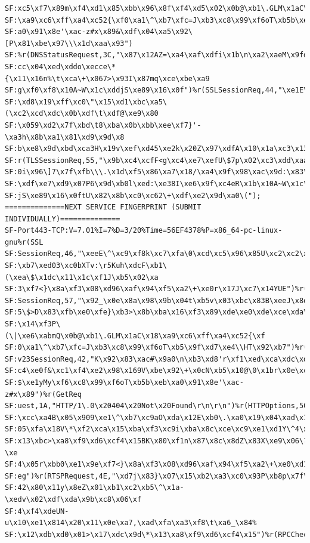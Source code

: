 \documentclass[12pt,a4paper]{report}
\begin{document}
\begin{lstlisting}[breaklines]
SF:xc5\xf7\x89m\xf4\xd1\x85\xbb\x96\x8f\xf4\xd5\x02\x0b@\xb1\.GLM\x1aC\x18
SF:\xa9\xc6\xff\xa4\xc52{\xf0\xa1\^\xb7\xfc=J\xb3\xc8\x99\xf6oT\xb5b\xeb\x
SF:a0\x91\x8e'\xac-z#x\x89&\xdf\x04\xa5\x92\[P\x81\xbe\x97\\\x1d\xaa\x93")
SF:%r(DNSStatusRequest,3C,"\x87\x12AZ=\xa4\xaf\xdfi\x1b\n\xa2\xaeM\x9fd@\x
SF:cc\x04\xed\xddo\xecce\*{\x11\x16n%\t\xca\+\x067>\x93I\x87mq\xce\xbe\xa9
SF:g\xf0\xf8\x10A~W\x1c\xddjS\xe89\x16\x0f")%r(SSLSessionReq,44,"\xe1E\x95
SF:\xd8\x19\xff\xc0\"\x15\xd1\xbc\xa5\(\xc2\xcd\xdc\x0b\xdf\t\xdf@\xe9\x80
SF:\x059\xd2\x7f\xbd\t8\xba\x0b\xbb\xee\xf7}'-\xa3h\x8b\xa1\x81\xd9\x9d\x8
SF:b\xe8\x9d\xbd\xca3H\x19v\xef\xd45\xe2k\x20Z\x97\xdfA\x10\x1a\xc3\x13")%
SF:r(TLSSessionReq,55,"\x9b\xc4\xcfF<g\xc4\xe7\xefU\$7p\x02\xc3\xdd\xaa\xe
SF:0i\x96\]7\x7f\xfb\\\.\x1d\xf5\x86\xa7\x18/\xa4\x9f\x98\xac\x9d:\x83\x84
SF:\xdf\xe7\xd9\x07P6\x9d\xb0l\xed:\xe38I\xe6\x9f\xc4eR\x1b\x10A~W\x1c\xdd
SF:jS\xe89\x16\x0ftU\x82\x8b\xc0\xc62\+\xdf\xe2\x9d\xa0\(");
==============NEXT SERVICE FINGERPRINT (SUBMIT INDIVIDUALLY)==============
SF-Port443-TCP:V=7.01%I=7%D=3/20%Time=56EF4378%P=x86_64-pc-linux-gnu%r(SSL
SF:SessionReq,46,"\xeeE\^\xc9\xf8k\xc7\xfa\0\xcd\xc5\x96\x85U\xc2\xc2\x88`
SF:\xb7\xed03\xc0bXTv:\r5Kuh\xdcF\xb1\(\xea\$\x1dc\x11\x1c\xf1J\xb5\x02\xa
SF:3\xf7<}\x8a\xf3\x08\xd96\xaf\x94\xf5\xa2\+\xe0r\x17J\xc7\x14YUE")%r(TLS
SF:SessionReq,57,"\x92_\x0e\x8a\x98\x9b\x04t\xb5v\x03\xbc\x83B\xeeJ\x8e\xa
SF:5\$>D\x83\xfb\xe0\xfe}\xb3>\x8b\xba\x16\xf3\x89\xde\xe0\xde\xce\xda\xdb
SF:\x14\xf3P\(\|\xe6\xabmQ\x0b@\xb1\.GLM\x1aC\x18\xa9\xc6\xff\xa4\xc52{\xf
SF:0\xa1\^\xb7\xfc=J\xb3\xc8\x99\xf6oT\xb5\x9f\xd7\xe4\\HT\x92\xb7")%r(SSL
SF:v23SessionReq,42,"K\x92\x83\xac#\x9a0\n\xb3\xd8'r\xf1\xed\xca\xdc\xd4\x
SF:c4\xe0f&\xc1\xf4\xe2\x98\x169V\xbe\x92\+\x0cN\xb5\x10@\0\x1br\x0e\xcdB\
SF:$\xe1yMy\xf6\xc8\x99\xf6oT\xb5b\xeb\xa0\x91\x8e'\xac-z#x\x89")%r(GetReq
SF:uest,1A,"HTTP/1\.0\x20404\x20Not\x20Found\r\n\r\n")%r(HTTPOptions,5C,"/
SF:\xcc\xa4B\x05\x909\xe1\^\xb7\xc9aO\xda\x12E\xb0\.\xa0\x19\x04\xad\x1d\x
SF:05\xfa\x18V\*\xf2\xca\x15\xba\xf3\xc9i\xba\x8c\xce\xc9\xe1\xd1Y\^4\x81\
SF:x13\xbc>\xa8\xf9\xd6\xcf4\x15BK\x80\xf1n\x87\x8c\x8dZ\x83X\xe9\x06\?\xe
SF:4\x05r\xbb0\xe1\x9e\xf7<}\x8a\xf3\x08\xd96\xaf\x94\xf5\xa2\+\xe0\xd1\xc
SF:eg")%r(RTSPRequest,4E,"\xd7j\x83}\x07\x15\xb2\xa3\xc0\x93P\xb8p\x7f\xb2
SF:42\x80\x11y\x8eZ\x01\xb1\xc2\xb5\^\x1a-\xedv\x02\xdf\xda\x9b\xc8\x06\xf
SF:4\xf4\xdeUN-u\x10\xe1\x814\x20\x11\x0e\xa7,\xad\xfa\xa3\xf8\t\xa6_\x84%
SF:\x12\xdb\xd0\x01>\x17\xdc\x9d\*\x13\xa8\xf9\xd6\xcf4\x15")%r(RPCCheck,3

\end{lstlisting}
\end{document}
